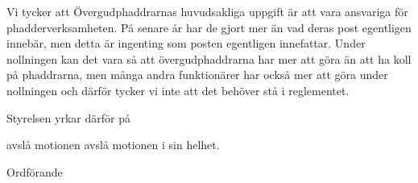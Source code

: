\documentclass[../_main/handlingar.tex]{subfiles}
\begin{document}
\motionssvar
Vi tycker att Övergudphaddrarnas huvudsakliga uppgift är att vara ansvariga för phadderverksamheten. På senare år har de gjort mer än vad deras post egentligen innebär, men detta är ingenting som posten egentligen innefattar. Under nollningen kan det vara så att övergudphaddrarna har mer att göra än att ha koll på phaddrarna, men många andra funktionärer har också mer att göra under nollningen och därför tycker vi inte att det behöver stå i reglementet.

Styrelsen yrkar därför på

\begin{attsatser}
    \att avslå motionen avslå motionen i sin helhet.
\end{attsatser}


\begin{signatures}{1}
	\ist
	\signature{Daniel Bakic}{Ordförande}
\end{signatures}
\end{document}
